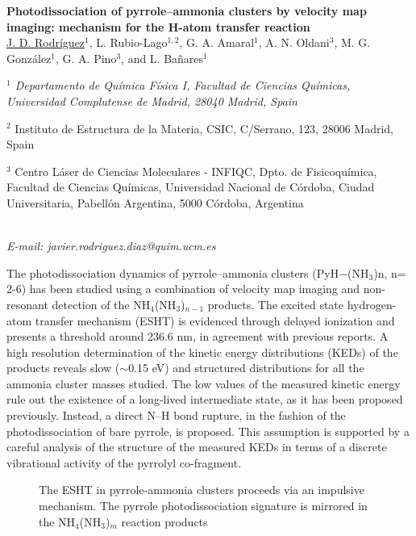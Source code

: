 \newpage
\setcounter{figure}{0}
\begin{center}
{\bf \Large
Photodissociation of pyrrole–ammonia clusters by velocity
map imaging:
mechanism for the H-atom transfer reaction
}
\\
\vspace{0.5cm}
\underline{J. D. Rodríguez}$^{1}$, L. Rubio-Lago$^{1,2}$, G. A. Amaral$^{1}$, A. N. Oldani$^{3}$,
M. G. González$^{1}$, G. A. Pino$^{3}$, and L. Bañares$^{1}$
\\
\vspace{0.5cm}
{\it
$^{1}$ Departamento de Química Física I, Facultad de Ciencias Químicas,
Universidad Complutense de Madrid, 28040 Madrid, Spain

$^{2}$ Instituto de Estructura de la Materia, CSIC, C/Serrano, 123,
28006 Madrid, Spain

$^{3}$ Centro Láser de Ciencias Moleculares - INFIQC, Dpto. de
Fisicoquímica, Facultad de Ciencias Químicas, Universidad Nacional
de Córdoba, Ciudad Universitaria, Pabellón Argentina, 5000
Córdoba, Argentina
}
\\
\vspace{0.5cm}
{\it E-mail: javier.rodriguez.diaz@quim.ucm.es}
\vspace{0.5cm}
\end{center}
The photodissociation dynamics of pyrrole–ammonia clusters (PyH$-$(NH$_{3}$)n, n= 2-6)
has been studied using a combination of velocity map imaging and non-resonant
detection of the NH$_{4}$(NH$_{3}$)$_{n-1}$ products. The excited state hydrogen-atom transfer
mechanism (ESHT) is evidenced through delayed ionization and presents a threshold
around 236.6 nm, in agreement with previous reports. A high resolution
determination of the kinetic energy distributions (KEDs) of the products reveals slow
($\sim$0.15 eV) and structured distributions for all the ammonia cluster masses studied.
The low values of the measured kinetic energy rule out the existence of a long-lived
intermediate state, as it has been proposed previously. Instead, a direct N--H bond
rupture, in the fashion of the photodissociation of bare pyrrole, is proposed. This
assumption is supported by a careful analysis of the structure of the measured KEDs
in terms of a discrete vibrational activity of the pyrrolyl co-fragment.
\\
\begin{figure}[h]
 \centerline{}
 \caption[]{ The ESHT in pyrrole-ammonia clusters proceeds via an impulsive mechanism.  The pyrrole photodissociation signature is mirrored in the NH$_{4}$(NH$_{3}$)$_{m}$ reaction products }
\end{figure}
